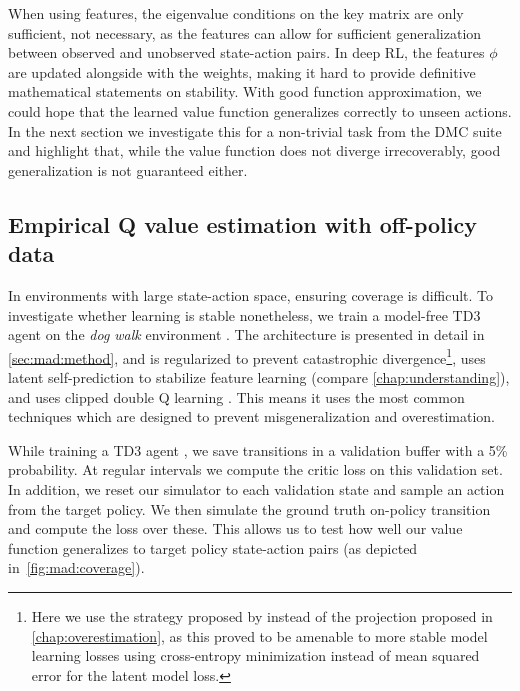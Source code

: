 When using features, the eigenvalue conditions on the key matrix are only sufficient, not necessary, as the features can allow for sufficient generalization between observed and unobserved state-action pairs.
In deep RL, the features $\phi$ are updated alongside with the weights, making it hard to provide definitive mathematical statements on stability.
With good function approximation, we could hope that the learned value function generalizes correctly to unseen actions.
In the next section we investigate this for a non-trivial task from the DMC suite and highlight that, while the value function does not diverge irrecoverably, good generalization is not guaranteed either. %

\subsection{Empirical Q value estimation with off-policy data}
\label{sec:mad:off-policy-eval-exp}


In environments with large state-action space, ensuring coverage is difficult.
To investigate whether learning is stable nonetheless, we train a model-free TD3 agent on the \emph{dog walk} environment \parencite{tunyasuvunakool2020dmcontrol}.
The architecture is presented in detail in \autoref{sec:mad:method}, and is regularized to prevent catastrophic divergence\footnote{Here we use the strategy proposed by \textcite{lavoie2023simplicial} instead of the projection proposed in \autoref{chap:overestimation}, as this proved to be amenable to more stable model learning losses using cross-entropy minimization instead of mean squared error for the latent model loss.}, uses latent self-prediction to stabilize feature learning (compare \autoref{chap:understanding}), and uses clipped double Q learning \parencite{fujimoto2018addressing}.
This means it uses the most common techniques which are designed to prevent misgeneralization and overestimation.

While training a TD3 agent \parencite{fujimoto2018addressing}, we save transitions in a validation buffer with a 5\% probability.
At regular intervals we compute the critic loss on this validation set.
In addition, we reset our simulator to each validation state and sample an action from the target policy.
We then simulate the ground truth on-policy transition and compute the loss over these.
This allows us to test how well our value function generalizes to target policy state-action pairs (as depicted in~\autoref{fig:mad:coverage}).


